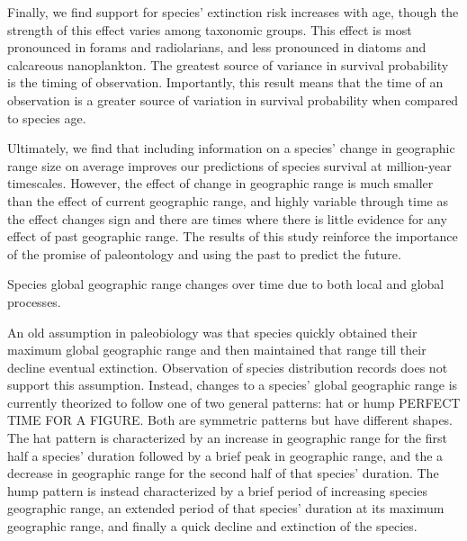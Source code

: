 \documentclass[12pt,letterpaper]{article}
\begin{document}
Finally, we find support for species' extinction risk increases with age, though the strength of this effect varies among taxonomic groups. This effect is most pronounced in forams and radiolarians, and less pronounced in diatoms and calcareous nanoplankton. The greatest source of variance in survival probability is the timing of observation. Importantly, this result means that the time of an observation is a greater source of variation in survival probability when compared to species age. 

Ultimately, we find that including information on a species' change in geographic range size on average improves our predictions of species survival at million-year timescales. However, the effect of change in geographic range is much smaller than the effect of current geographic range, and highly variable through time as the effect changes sign and there are times where there is little evidence for any effect of past geographic range. The results of this study reinforce the importance of the promise of paleontology and using the past to predict the future.



Species global geographic range changes over time due to both local and global processes.

An old assumption in paleobiology was that species quickly obtained their maximum global geographic range and then maintained that range till their decline eventual extinction. Observation of species distribution records does not support this assumption. Instead, changes to a species' global geographic range is currently theorized to follow one of two general patterns: hat or hump PERFECT TIME FOR A FIGURE. Both are symmetric patterns but have different shapes. The hat pattern is characterized by an increase in geographic range for the first half a species' duration followed by a brief peak in geographic range, and the a decrease in geographic range for the second half of that species' duration. The hump pattern is instead characterized by a brief period of increasing species geographic range, an extended period of that species' duration at its maximum geographic range, and finally a quick decline and extinction of the species.
\end{document}
